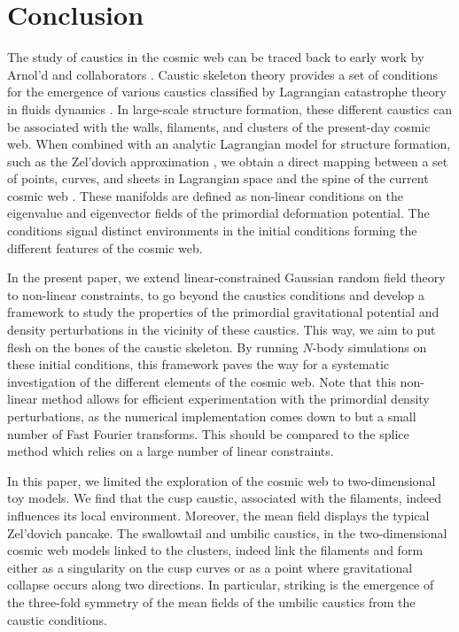 \documentclass[a4paper, 11pt]{article}
\begin{document}
\section{Conclusion}\label{sec:conclusion}
The study of caustics in the cosmic web can be traced back to early work by Arnol'd and collaborators \cite{Arnold:1982a,Arnold:1982b,Shandarin:2019,Shandarin:2021}. Caustic skeleton theory provides a set of conditions for the emergence of various caustics classified by Lagrangian catastrophe theory in fluids dynamics \cite{Arnold:1982a,Hidding:2014,Feldbrugge:2018}. In large-scale structure formation, these different caustics can be associated with the walls, filaments, and clusters of the present-day cosmic web. When combined with an analytic Lagrangian model for structure formation, such as the Zel'dovich approximation \cite{Zeldovich:1970}, we obtain a direct mapping between a set of points, curves, and sheets in Lagrangian space and the spine of the current cosmic web \cite{Feldbrugge:2018}. These manifolds are defined as non-linear conditions on the eigenvalue and eigenvector fields of the primordial deformation potential. The conditions signal distinct environments in the initial conditions forming the different features of the cosmic web.

In the present paper, we extend linear-constrained Gaussian random field theory \cite{Hoffman:1991,Weygaert:1996} to non-linear constraints, to go beyond the caustics conditions and develop a framework to study the properties of the primordial gravitational potential and density perturbations in the vicinity of these caustics. This way, we aim to put flesh on the bones of the caustic skeleton. By running $N$-body simulations on these initial conditions, this framework paves the way for a systematic investigation of the different elements of the cosmic web. Note that this non-linear method allows for efficient experimentation with the primordial density perturbations, as the numerical implementation comes down to but a small number of Fast Fourier transforms. This should be compared to the splice method \cite{Cadiou:2021} which relies on a large number of linear constraints.

In this paper, we limited the exploration of the cosmic web to two-dimensional toy models. We find that the cusp caustic, associated with the filaments, indeed influences its local environment. Moreover, the mean field displays the typical Zel'dovich pancake. The swallowtail and umbilic caustics, in the two-dimensional cosmic web models linked to the clusters, indeed link the filaments and form either as a singularity on the cusp curves or as a point where gravitational collapse occurs along two directions. In particular, striking is the emergence of the three-fold symmetry of the mean fields of the umbilic caustics from the caustic conditions.
\end{document}
